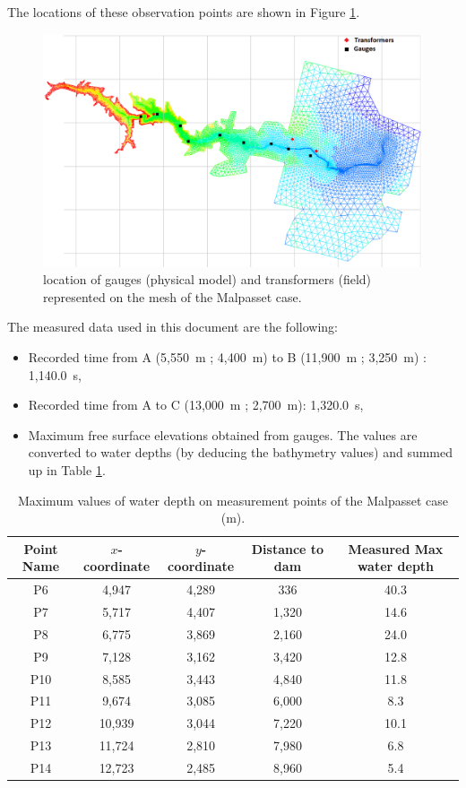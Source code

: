The locations of these observation points are shown in Figure \ref{fig:malpasset:MeasurePoints}.
\begin{figure}[H]
  \centering
  \includegraphics[width=1.0\textwidth]{img/MeasurePoints.png}
  \caption{location of gauges (physical model) and transformers (field) represented on the mesh of the Malpasset case.}\label{fig:malpasset:MeasurePoints}
\end{figure}

The measured data used in this document are the following:
\begin{itemize}
\itemsep0em
\item Recorded time from A (5,550~m ; 4,400~m) to B (11,900~m ; 3,250~m) : 1,140.0~s,
\item Recorded time from A to C (13,000~m ; 2,700~m): 1,320.0~s,
\item Maximum free surface elevations obtained from gauges. The values are converted to water depths (by deducing the bathymetry values) and summed up in Table \ref{tab:malpasset:MaxMeasures}.
\end{itemize}

\begin{table}[H]
  \centering
  \begin{tabular}{|c|c|c|c|c|}
    \hline Point Name & $x$-coordinate & $y$-coordinate & Distance to dam & Measured Max water depth \\
    \hline P6 & 4,947 & 4,289 & 336 & 40.3\\
    P7 & 5,717 & 4,407 & 1,320 & 14.6\\
    P8 & 6,775 & 3,869 & 2,160 & 24.0\\
    P9 & 7,128 & 3,162 & 3,420 & 12.8\\
    P10 & 8,585 & 3,443 & 4,840 & 11.8 \\
    P11 & 9,674 & 3,085 & 6,000 & 8.3\\
    P12 & 10,939 & 3,044 & 7,220 & 10.1\\
    P13 & 11,724 & 2,810 & 7,980 & 6.8 \\
    P14 & 12,723 & 2,485 & 8,960 & 5.4\\
    \hline
  \end{tabular}
  \caption{Maximum values of water depth on measurement points of the Malpasset case (m).}
  \label{tab:malpasset:MaxMeasures}
\end{table}


